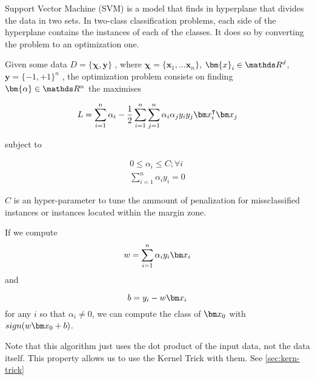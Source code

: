   \begin{pre-delivery}
    Support Vector Machine\cite{Cortes1995} (SVM) is a model that finds in hyperplane that
    divides the data in two sets. In two-class classification problems, each
    side of the hyperplane contains the instances of each of the classes.
    It does so by converting the problem to an optimization one.

    Given some data
    $D = \{\bm{\chi}, \bm{y}\}$
    , where
    $\bm{\chi} = \{\bm{x}_1, \ldots \bm{x}_n\}$, $\bm{x}_i \in \reals^d$, $\bm{y} = \{-1, +1\}^n$
    , the optimization problem consists on finding $\bm{\alpha} \in \reals^n$
    the maximises

\begin{equation}
  L = \sum_{i = 1}^n\alpha_i -\frac{1}{2}\sum_{i = 1}^n\sum_{j = 1}^n\alpha_i\alpha_jy_iy_j\vx_i^\transp\vx_j
\end{equation}

subject to

\begin{align}
  0 \leq \alpha_i \leq C; \forall i\\
  \sum_{i = 1}^n \alpha_iy_i = 0
\end{align}


$C$ is an hyper-parameter to tune the ammount of penalization for missclassified
instances or instances located within the margin zone.

If we compute
\begin{equation}
  w = \sum_{i = 1}^n\alpha_iy_i\vx_i
\end{equation}
and

\begin{equation}
  b = y_i - w\vx_i
\end{equation}
for any $i$ so that $\alpha_i \neq 0$, we can compute the class of $\vx_0$ with
$sign(w\vx_0 + b)$.

Note that this algorithm just uses the dot product of the input data, not the
data itself. This property allows us to use the Kernel Trick with them.
See \ref{sec:kern-trick}

\end{pre-delivery}


